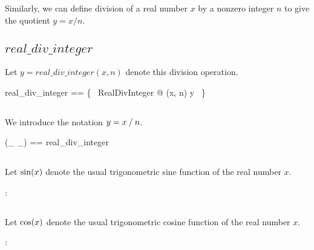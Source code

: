 \documentclass{amsart}
\begin{document}
Similarly, we can define division of a real number $x$ by a nonzero integer $n$
to give the quotient $y = x / n$.


\subsection{$real\_div\_integer$}

Let $y = real\_div\_integer(x, n)$ denote this division operation.

\begin{zed}
	real\_div\_integer == \{~ RealDivInteger @ (x, n) \mapsto y ~\}
\end{zed}

\subsection{}

We introduce the notation $y = x \mathbin{/} n$.

\begin{zed}
	(\_ \divRZ \_) == real\_div\_integer
\end{zed}

\subsection{}

Let $\operatorname{sin}(x)$ denote the usual trigonometric sine function of the real number $x$.

\begin{axdef}
	\sinR : \R \fun \R
\end{axdef}

\subsection{}

Let $\operatorname{cos}(x)$ denote the usual trigonometric cosine function of the real number $x$.

\begin{axdef}
	\cosR : \R \fun \R
\end{axdef}

\subsection{}
\end{document}
